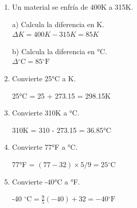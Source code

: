 \documentclass[a4paper, 11pt]{article}
\newcommand{\Pspace}{0.5cm}
\newcommand{\Aspace}{0.2cm}
\begin{document}
\begin{enumerate}
    \vspace{\Pspace}
    \item Un material se enfría de 400K a 315K. \par
        \vspace{\Aspace} \par
        a) Calcula la diferencia en K.
        \\ { \color{azul} $\Delta K = 400K - 315K = 85K$ }

        \vspace{\Aspace} \par
        b) Calcula la diferencia en °C.
        \\ { \color{azul} $\Delta \mathrm{^\circ C} = 85\mathrm{^\circ F} $ }



    \vspace{\Pspace}
    \item Convierte 25°C a K.\par
        \vspace{\Aspace} \par
        { \color{azul} 25°C = 25 + 273.15 = 298.15K }



    \vspace{\Pspace}
    \item Convierte 310K a °C. \par
        \vspace{\Aspace} \par
        { \color{azul}  310K = 310 - 273.15 = 36.85°C}



    \vspace{\Pspace}
    \item Convierte 77°F a °C. \par
        \vspace{\Aspace} \par
        { \color{azul} 77°F = $(77 - 32) \times 5/9 = 25 \mathrm{^\circ C}$ }



    \vspace{\Pspace}
    \item Convierte -40°C a °F. \par
        \vspace{\Aspace} \par
        { \color{azul} -40 $\mathrm{^\circ C} = \frac{9}{5} (-40) + 32 = -40 \mathrm{^\circ F}$}




\end{enumerate}
\end{document}
